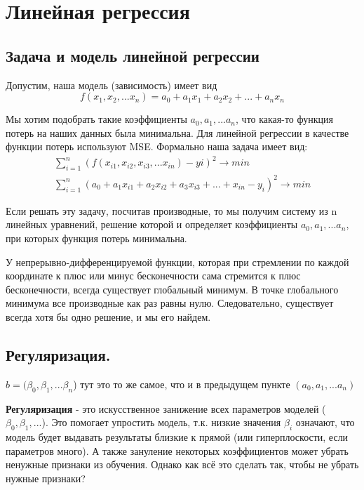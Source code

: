 
\section{Линейная регрессия}

\subsection{Задача и модель линейной регрессии}

Допустим, наша модель (зависимость) имеет вид
$$
f(x_1, x_2, ... x_n) = a_0 + a_1x_1 + a_2x_2 + ... + a_nx_n
$$

Мы хотим подобрать такие коэффициенты $a_0, a_1, ... a_n$, что какая-то функция потерь на наших данных была минимальна. Для линейной регрессии в качестве функции потерь используют MSE. Формально наша задача имеет вид:
$$
\begin{array}{l}
\sum_{i=1}^{n}\left(f\left(x_{i 1}, x_{i 2}, x_{i 3}, ... x_{i n}\right)-y i\right)^{2} \rightarrow m i n \\
\sum_{i=1}^{n}\left(a_{0}+a_{1} x_{i 1}+a_{2} x_{i 2}+a_{3} x_{i 3}+ ... + x_{in}-\right.
\left.y_{i}\right)^{2} \rightarrow m i n
\end{array}
$$

Если решать эту задачу, посчитав производные, то мы получим систему из n линейных уравнений, решение которой и определяет коэффициенты $a_0, a_1,... a_n$, при которых функция потерь минимальна.

У непрерывно-дифференцируемой функции, которая при стремлении по каждой координате к плюс или минус бесконечности сама стремится к плюс бесконечности, всегда существует глобальный минимум. В точке глобального минимума все производные как раз равны нулю. Следовательно, существует всегда хотя бы одно решение, и мы его найдем.

\subsection{Регуляризация.}

$b = (\beta_0,\beta_1,...\beta_n$) тут это то же самое, что и в предыдущем пункте $(a_0, a_1,... a_n)$

\textbf{Регуляризация} - это искусственное занижение всех параметров моделей ($\beta_0,\beta_1,...$). Это помогает упростить модель, т.к. низкие значения $\beta_i$ означают, что модель будет выдавать результаты близкие к прямой (или гиперплоскости, если параметров много). А также зануление некоторых коэффициентов может убрать ненужные признаки из обучения. Однако как всё это сделать так, чтобы не убрать нужные признаки?

